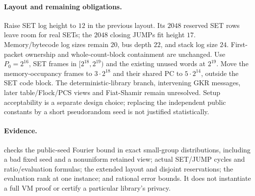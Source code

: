 \documentclass[11pt]{article}
\begin{document}
\paragraph{Layout and remaining obligations.} Raise SET log height to $12$ in the previous layout. Its $2048$ reserved SET rows leave room for real SETs; the $2048$ closing JUMPs fit height $17$. Memory/bytecode log sizes remain $20$, bus depth $22$, and stack log size $24$. First-packet ownership and whole-count-block containment are unchanged. Use $P_0=2^{16}$, SET frames in $[2^{18},2^{19})$ and the existing unused words at $2^{19}$. Move the memory-occupancy frames to $3\cdot2^{18}$ and their shared PC to $5\cdot2^{14}$, outside the SET code block. The deterministic-library branch, intervening GKR messages, later table/Flock/PCS views and Fiat-Shamir remain unresolved. Setup acceptability is a separate design choice; replacing the independent public constants by a short pseudorandom seed is not justified statistically.

\paragraph{Evidence.}  checks the public-seed Fourier bound in exact small-group distributions, including a bad fixed seed and a nonuniform retained view; actual SET/JUMP cycles and ratio/evaluation formulas; the extended layout and disjoint reservations; the evaluation rank at one instance; and rational error bounds. It does not instantiate a full VM proof or certify a particular library's privacy.
\end{document}
